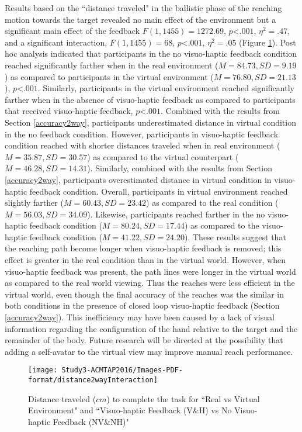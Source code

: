 Results based on the ``distance traveled" in the ballistic phase of the reaching motion towards the target revealed no main effect of the environment but a significant main effect of the feedback $F(1,1455)=1272.69$, $p$\textless$.001$, $\eta^{2}=.47$, and a significant interaction, $F(1,1455)=68$, $p$\textless$.001$, $\eta^{2}=.05$ (Figure \ref{fig:distance2way}). Post hoc analysis indicated that participants in the no visuo-haptic feedback condition reached significantly farther when in the real environment ($M=84.73, SD=9.19$) as compared to participants in the virtual environment ($M=76.80, SD=21.13$), $p$\textless$.001$. Similarly, participants in the virtual environment reached significantly farther when in the absence of visuo-haptic feedback as compared to participants that received visuo-haptic feedback, $p$\textless$.001$. Combined with the results from Section \ref{accuracy2way}, participants underestimated distance in virtual condition in the no feedback condition. However, participants in visuo-haptic feedback condition reached with shorter distances traveled when in real environment ($M=35.87, SD=30.57$) as compared to the virtual counterpart ($M=46.28, SD=14.31$). Similarly, combined with the results from Section \ref{accuracy2way}, participants overestimated distance in virtual condition in visuo-haptic feedback condition. Overall, participants in virtual environment reached slightly farther ($M=60.43, SD=23.42$) as compared to the real condition ($M=56.03, SD=34.09$). Likewise, participants reached farther in the no visuo-haptic feedback condition ($M=80.24, SD=17.44$) as compared to the visuo-haptic feedback condition ($M=41.22, SD=24.20$). These results suggest that the reaching path become longer when visuo-haptic feedback is removed; this effect is greater in the real condition than in the virtual world. However, when visuo-haptic feedback was present, the path lines were longer in the virtual world as compared to the real world viewing. Thus the reaches were less efficient in the virtual world, even though the final accuracy of the reaches was the similar in both conditions in the presence of closed loop visuo-haptic feedback (Section \ref{accuracy2way}). This inefficiency may have been caused by a lack of visual information regarding the configuration of the hand relative to the target and the remainder of the body. Future research will be directed at the possibility that adding a self-avatar to the virtual view may improve manual reach performance.


\begin{figure}
	\centering
	\texttt{[image: Study3-ACMTAP2016/Images-PDF-format/distance2wayInteraction]}
	\caption{\textsf{Distance traveled ($cm$) to complete the task for ``Real vs Virtual Environment" and ``Visuo-haptic Feedback (V\&H) vs No Visuo-haptic Feedback (NV\&NH)"}}
	\label{fig:distance2way}
\end{figure}

